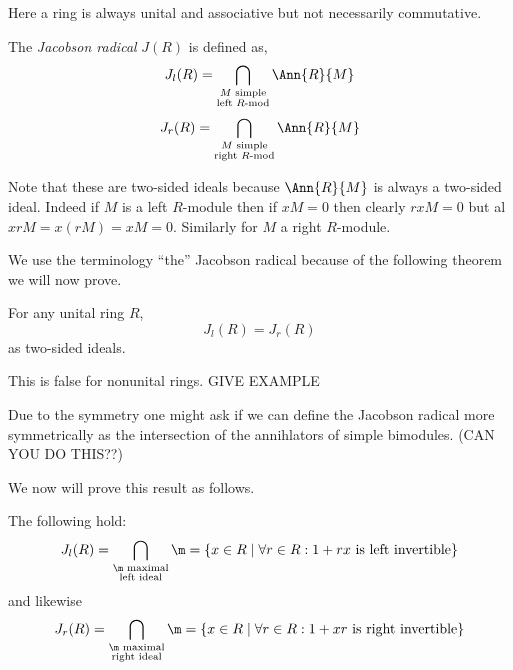 \documentclass[12pt]{article}
\begin{document}
Here a ring is always unital and associative but not necessarily commutative.

\begin{defn}
The \textit{Jacobson radical} $J(R)$ is defined as,
\[ J_{l}(R) = \bigcap_{\substack{M \text{ simple} \\ \text{left } R\text{-mod}}} \Ann{R}{M} \]
\[ J_{r}(R) = \bigcap_{\substack{M \text{ simple} \\ \text{right } R\text{-mod}}} \Ann{R}{M} \]
\end{defn}

Note that these are two-sided ideals because $\Ann{R}{M}$ is always a two-sided ideal. Indeed if $M$ is a left $R$-module then if $x M = 0$ then clearly $rxM = 0$ but al $x r M = x (r M) = x M = 0$. Similarly for $M$ a right $R$-module.

We use the terminology ``the'' Jacobson radical because of the following theorem we will now prove.

\begin{theorem}
For any unital ring $R$,
\[ J_l(R) = J_r(R) \]
as two-sided ideals.
\end{theorem}

\begin{rmk}
This is false for nonunital rings. GIVE EXAMPLE
\end{rmk}

\begin{rmk}
Due to the symmetry one might ask if we can define the Jacobson radical more symmetrically as the intersection of the annihlators of simple bimodules. (CAN YOU DO THIS??)
\end{rmk}

We now will prove this result as follows.

\begin{prop}
The following hold:
\[ J_l(R) = \bigcap_{\substack{\m \text{ maximal} \\ \text{left ideal}}} \m = \{ x \in R \mid \forall r \in R : 1 + r x \text{ is left invertible} \} \]
and likewise
\[ J_r(R) = \bigcap_{\substack{\m \text{ maximal} \\ \text{right ideal}}} \m = \{ x \in R \mid \forall r \in R : 1 + xr \text{ is right invertible} \} \]
\end{prop}
\end{document}
